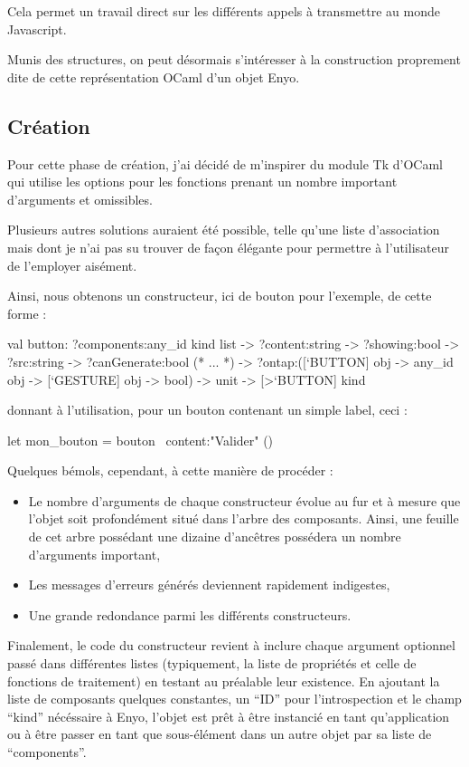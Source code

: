 \documentclass[11pt,a4paper]{report}
\begin{document}
Cela permet un travail direct sur les différents appels à transmettre au monde Javascript.

Munis des structures, on peut désormais s'intéresser à la construction proprement dite de cette
représentation OCaml d'un objet Enyo.

\subsection{Création}

Pour cette phase de création, j'ai décidé de m'inspirer du module Tk d'OCaml qui utilise les options
pour les fonctions prenant un nombre important d'arguments et omissibles.

Plusieurs autres solutions auraient été possible, telle qu'une liste d'association mais dont
je n'ai pas su trouver de façon élégante pour permettre à l'utilisateur de l'employer aisément.

Ainsi, nous obtenons un constructeur, ici de bouton pour l'exemple, de cette forme :

\begin{OCaml}
  val button:
    ?components:any_id kind list
    -> ?content:string
    -> ?showing:bool
    -> ?src:string
    -> ?canGenerate:bool
    (* ... *)
    -> ?ontap:([`BUTTON] obj -> 
               any_id obj -> 
               [`GESTURE] obj -> bool)
    -> unit -> [>`BUTTON] kind
\end{OCaml}

donnant à l'utilisation, pour un bouton contenant un simple label, ceci :

\label{bouton_kind_ex}
\begin{OCaml}
  let mon_bouton = bouton ~content:"Valider" ()
\end{OCaml}

Quelques bémols, cependant, à cette manière de procéder :
\begin{itemize}
\item Le nombre d'arguments de chaque constructeur évolue au fur et à mesure que l'objet
soit profondément situé dans l'arbre des composants. Ainsi, une feuille de cet arbre possédant
une dizaine d'ancêtres possédera un nombre d'arguments important,
\item Les messages d'erreurs générés deviennent rapidement indigestes,
\item Une grande redondance parmi les différents constructeurs.
\end{itemize}

Finalement, le code du constructeur revient à inclure chaque argument optionnel passé dans différentes 
listes (typiquement, la liste de propriétés et celle de fonctions de traitement) en testant
au préalable leur existence.
En ajoutant la liste de composants quelques constantes, un ``ID'' pour l'introspection et 
le champ ``kind'' nécéssaire à Enyo, l'objet est prêt à être instancié en tant qu'application 
ou à être passer en tant que sous-élément dans un autre objet par sa liste de ``components''.
\end{document}
